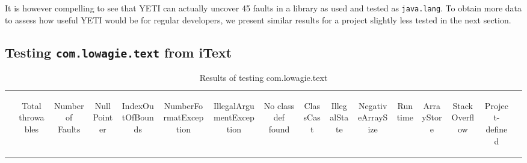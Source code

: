 It is however compelling to see that YETI can actually uncover 45 faults in a library as used and tested as \texttt{java.lang}. To obtain more data to assess how useful YETI would be for regular developers, we present similar results for a project slightly less tested in the next section.



\subsection{Testing \texttt{com.lowagie.text} from iText}

\begin{table}[h!]
\caption{Results of testing com.lowagie.text}\label{tab:comlowagietext}
\begin{center}
\begin{tabular}{l c c c c c c c c c c c c c c c}
\hline
&\begin{sideways}Total throwables\end{sideways}&\begin{sideways}Number of Faults\end{sideways}&\begin{sideways}NullPointer\end{sideways}&\begin{sideways}IndexOutOfBounds\end{sideways}&\begin{sideways}NumberFormatException\end{sideways}&\begin{sideways}IllegalArgumentException\end{sideways}&\begin{sideways}No class def found\end{sideways}&\begin{sideways}ClassCast\end{sideways}&\begin{sideways}IllegalState\end{sideways}&\begin{sideways}NegativeArraySize\end{sideways}&\begin{sideways}Runtime\end{sideways}&\begin{sideways}ArrayStore\end{sideways}&\begin{sideways}StackOverflow\end{sideways}&\begin{sideways}Project-defined\end{sideways}\\

\end{tabular}
\end{center}
\end{table}
